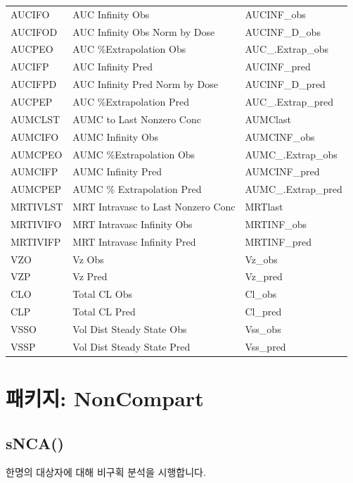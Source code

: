 \documentclass[12pt,]{krantz}
\begin{document}
\begin{longtable}[t]{lll}
AUCIFO & AUC Infinity Obs & AUCINF\_obs\\
AUCIFOD & AUC Infinity Obs Norm by Dose & AUCINF\_D\_obs\\
\addlinespace
AUCPEO & AUC \%Extrapolation Obs & AUC\_.Extrap\_obs\\
AUCIFP & AUC Infinity Pred & AUCINF\_pred\\
AUCIFPD & AUC Infinity Pred Norm by Dose & AUCINF\_D\_pred\\
AUCPEP & AUC \%Extrapolation Pred & AUC\_.Extrap\_pred\\
AUMCLST & AUMC to Last Nonzero Conc & AUMClast\\
\addlinespace
AUMCIFO & AUMC Infinity Obs & AUMCINF\_obs\\
AUMCPEO & AUMC \%Extrapolation Obs & AUMC\_.Extrap\_obs\\
AUMCIFP & AUMC Infinity Pred & AUMCINF\_pred\\
AUMCPEP & AUMC \% Extrapolation Pred & AUMC\_.Extrap\_pred\\
MRTIVLST & MRT Intravasc to Last Nonzero Conc & MRTlast\\
\addlinespace
MRTIVIFO & MRT Intravasc Infinity Obs & MRTINF\_obs\\
MRTIVIFP & MRT Intravasc Infinity Pred & MRTINF\_pred\\
VZO & Vz Obs & Vz\_obs\\
VZP & Vz Pred & Vz\_pred\\
CLO & Total CL Obs & Cl\_obs\\
\addlinespace
CLP & Total CL Pred & Cl\_pred\\
VSSO & Vol Dist Steady State Obs & Vss\_obs\\
VSSP & Vol Dist Steady State Pred & Vss\_pred\\
\bottomrule
\end{longtable}

\hypertarget{-noncompart}{%
\chapter{패키지: NonCompart}\label{-noncompart}}

\hypertarget{snca}{%
\section{sNCA()}\label{snca}}

한명의 대상자에 대해 비구획 분석을 시행합니다.
\end{document}
